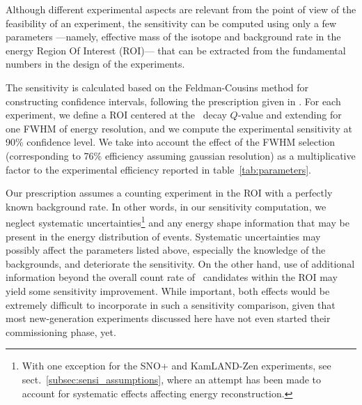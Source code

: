 
Although different experimental aspects are relevant from the point of view of the feasibility of an experiment, the sensitivity can be computed using only a few parameters ---namely, effective mass of the isotope and background rate in the energy Region Of Interest (ROI)--- that can be extracted from the fundamental numbers in the design of the experiments. 

The sensitivity is calculated based on the Feldman-Cousins method \cite{Feldman:1997qc} for constructing confidence intervals, following the prescription given in \cite{Gomez-Cadenas:2010zcc}. For each experiment, we define a ROI centered at the \bb\ decay $Q$-value and extending for one FWHM of energy resolution, and we compute the experimental sensitivity at 90\% confidence level. We take into account the effect of the FWHM selection (corresponding to 76\% efficiency assuming gaussian resolution) as a multiplicative factor to the experimental efficiency reported in table~\ref{tab:parameters}.

 Our prescription assumes a counting experiment in the ROI with a perfectly known background rate. In other words, in our sensitivity computation, we neglect systematic uncertainties\footnote{With one exception for the SNO+ and KamLAND-Zen experiments, see sect.~\ref{subsec:sensi_assumptions}, where an attempt has been made to account for systematic effects affecting energy reconstruction.} and any energy shape information that may be present in the energy distribution of events. Systematic uncertainties may possibly affect the parameters listed above, especially the knowledge of the backgrounds, and deteriorate the sensitivity. On the other hand, use of additional information beyond the overall count rate of \bbonu\ candidates within the ROI may yield some sensitivity improvement. While important, both effects would be extremely difficult to incorporate in such a sensitivity comparison, given that most new-generation experiments discussed here have not even started their commissioning phase, yet.


